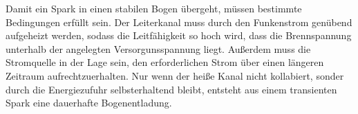 Damit ein Spark in einen stabilen Bogen übergeht, müssen bestimmte Bedingungen erfüllt sein. Der Leiterkanal muss durch den Funkenstrom genübend aufgeheizt werden, sodass die Leitfähigkeit so hoch wird, dass die Brennspannung unterhalb der angelegten Versorgunsspannung liegt. Außerdem muss die Stromquelle in der Lage sein, den erforderlichen Strom über einen längeren Zeitraum aufrechtzuerhalten. Nur wenn der heiße Kanal nicht kollabiert, sonder durch die Energiezufuhr selbsterhaltend bleibt, entsteht aus einem transienten Spark eine dauerhafte Bogenentladung.

